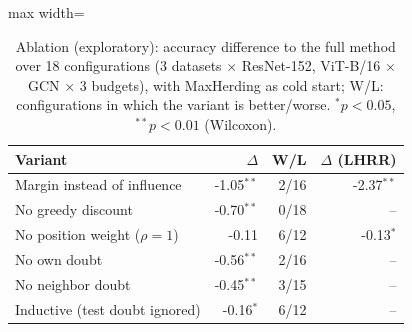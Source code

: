 \begin{table}[t]
\centering
\caption{Ablation (exploratory): accuracy difference to the full method over 18 configurations (3 datasets $\times$ ResNet-152, ViT-B/16 $\times$ GCN $\times$ 3 budgets), with MaxHerding as cold start; W/L: configurations in which the variant is better/worse. $^{*}p<0.05$, $^{**}p<0.01$ (Wilcoxon).}
\label{tab:ablation}
\footnotesize
\begin{adjustbox}{max width=\columnwidth}
\begin{tabular}{lrrr}
\toprule
Variant & $\Delta$ & W/L & $\Delta$ (LHRR) \\
\midrule
Margin instead of influence & -1.05$^{**}$ & 2/16 & -2.37$^{**}$ \\
No greedy discount & -0.70$^{**}$ & 0/18 & -- \\
No position weight ($\rho=1$) & -0.11 & 6/12 & -0.13$^{*}$ \\
No own doubt & -0.56$^{**}$ & 2/16 & -- \\
No neighbor doubt & -0.45$^{**}$ & 3/15 & -- \\
Inductive (test doubt ignored) & -0.16$^{*}$ & 6/12 & -- \\
\bottomrule
\end{tabular}
\end{adjustbox}
\end{table}
